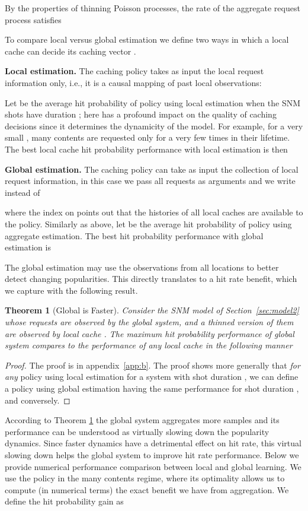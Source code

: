 \documentclass[10pt, conference, letterpaper]{IEEEtran}
\newtheorem{theorem}{Theorem}
\begin{document}
By the properties of thinning Poisson processes, the rate of the aggregate request process satisfies


To compare local versus global estimation we  define two ways in which a local cache  can decide its caching vector .

\noindent\textbf{Local estimation.} The caching policy  takes as input the local request information only, i.e., it is a causal mapping of past local observations:

Let  be the average hit probability of policy  using local estimation when the SNM shots have duration ; here
 has a profound impact on the quality of caching decisions since it determines the dynamicity of the model. For example, for a very small , many contents are requested only for a very few times in their lifetime. The best local cache hit probability performance with local estimation is then 




\noindent\textbf{Global estimation.} The caching policy can take as input the collection of local request information, in this case we pass all requests as arguments and we write  instead of 

where the index  on  points out that the histories of all local caches are available to the policy.
Similarly as above, let  be the average hit probability of policy  using aggregate estimation.
The best hit probability performance with global estimation is 

The global estimation may use the observations from all locations  to better detect changing popularities. This directly translates to a hit rate benefit, which we capture with the following result.

\begin{theorem}[Global is Faster]\label{th:agg}
Consider the SNM model of Section~\ref{sec:model2} whose  requests  are observed by the global system, and a thinned version of them  are observed by local cache . 
The maximum hit probability performance of global system  compares to the performance of any local cache  in the following manner

\end{theorem}
\begin{proof}
The proof is in appendix~\ref{app:b}. The proof shows more generally that \emph{for any} policy using local estimation for a system with shot duration , we can define a policy using global estimation having the same performance for shot duration , and conversely.
\end{proof}
According to Theorem \ref{th:agg} the global system aggregates more samples and its performance can be understood as virtually slowing down the popularity dynamics. 
Since faster dynamics have  a detrimental effect on hit rate, this virtual slowing down helps the global system to improve hit rate performance. 
Below we provide numerical performance comparison between local and global learning. We use the  policy in the many contents regime, where its optimality allows us to compute (in numerical terms) the exact benefit we have from aggregation. We define the hit probability gain as
\end{document}
